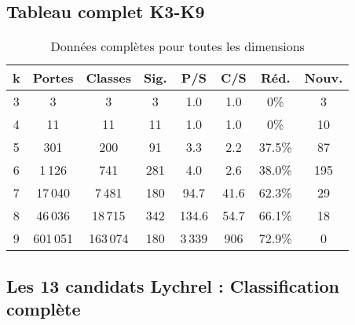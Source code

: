 \documentclass[12pt,a4paper]{article}
\theoremstyle{remark}
\begin{document}
\subsection{Tableau complet K3-K9}

\begin{table}[h]
\centering
\caption{Données complètes pour toutes les dimensions}
\begin{tabular}{cccccccc}
\toprule
\textbf{k} & \textbf{Portes} & \textbf{Classes} & \textbf{Sig.} & \textbf{P/S} & \textbf{C/S} & \textbf{Réd.} & \textbf{Nouv.}\\
\midrule
3 & 3 & 3 & 3 & 1.0 & 1.0 & 0\% & 3\\
4 & 11 & 11 & 11 & 1.0 & 1.0 & 0\% & 10\\
5 & 301 & 200 & 91 & 3.3 & 2.2 & 37.5\% & 87\\
6 & 1\,126 & 741 & 281 & 4.0 & 2.6 & 38.0\% & 195\\
7 & 17\,040 & 7\,481 & 180 & 94.7 & 41.6 & 62.3\% & 29\\
8 & 46\,036 & 18\,715 & 342 & 134.6 & 54.7 & 66.1\% & 18\\
9 & 601\,051 & 163\,074 & 180 & 3\,339 & 906 & 72.9\% & 0\\
\bottomrule
\end{tabular}
\end{table}

\subsection{Les 13 candidats Lychrel : Classification complète}
\end{document}
